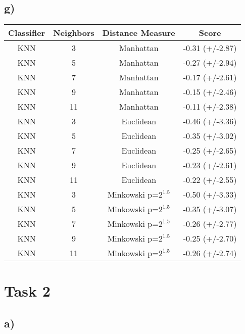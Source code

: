 \documentclass{article}
\begin{document}
        \subsection{g)}
          \begin{tabular}{cccc}
            \toprule
            Classifier &  Neighbors &    Distance Measure &    Score \\
            \midrule
            KNN &          3 &              Manhattan &  -0.31 (+/-2.87) \\
            KNN &          5 &              Manhattan &  -0.27 (+/-2.94) \\
            KNN &          7 &              Manhattan &  -0.17 (+/-2.61) \\
            KNN &          9 &              Manhattan &  -0.15 (+/-2.46) \\
            KNN &         11 &              Manhattan &  -0.11 (+/-2.38) \\
            KNN &          3 &              Euclidean &  -0.46 (+/-3.36) \\
            KNN &          5 &              Euclidean &  -0.35 (+/-3.02) \\
            KNN &          7 &              Euclidean &  -0.25 (+/-2.65) \\
            KNN &          9 &              Euclidean &  -0.23 (+/-2.61) \\
            KNN &         11 &              Euclidean &  -0.22 (+/-2.55) \\
            KNN &          3 &  Minkowski p=$2^{1.5}$ &  -0.50 (+/-3.33) \\
            KNN &          5 &  Minkowski p=$2^{1.5}$ &  -0.35 (+/-3.07) \\
            KNN &          7 &  Minkowski p=$2^{1.5}$ &  -0.26 (+/-2.77) \\
            KNN &          9 &  Minkowski p=$2^{1.5}$ &  -0.25 (+/-2.70) \\
            KNN &         11 &  Minkowski p=$2^{1.5}$ &  -0.26 (+/-2.74) \\
            \bottomrule
          \end{tabular}
      \section{Task 2}
          \subsection{a)}
\end{document}

